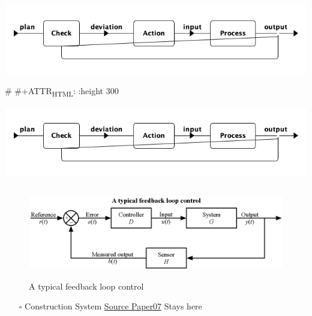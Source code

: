 \documentclass{article}
\begin{document}
\begin{center}
\includegraphics[width=.9\linewidth]{Figures/system_feedback_loop.png}
\end{center}

\# \#+ATTR\textsubscript{HTML}: :height 300

\begin{center}
\includegraphics[width=.9\linewidth]{Figures/system_feedback_loop.png}
\end{center}






\begin{figure}[htbp]
\centering
\includegraphics[height=150]{./Figures/A_typical_feedback_loop_control.eps}
\caption{\label{fig:org34e96d7}A typical feedback loop control}
\end{figure}


\begin{itemize}
\item[{$\square$}] Construction System
\uline{Source Paper07} Stays here
\end{itemize}
\end{document}
